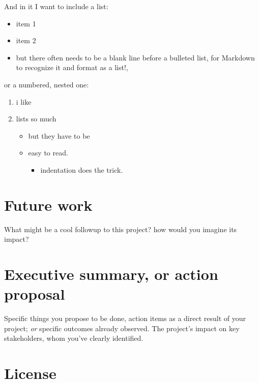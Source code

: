 \documentclass[
]{article}
\providecommand{\tightlist}{%
  \setlength{\itemsep}{0pt}\setlength{\parskip}{0pt}}
\begin{document}
And in it I want to include a list:

\begin{itemize}
\tightlist
\item
  item 1
\item
  item 2
\item
  but there often needs to be a blank line before a bulleted list, for
  Markdown to recognize it and format as a list!,
\end{itemize}

or a numbered, nested one:

\begin{enumerate}
\def\labelenumi{\arabic{enumi})}
\tightlist
\item
  i like
\item
  lists so much

  \begin{itemize}
  \tightlist
  \item
    but they have to be
  \item
    easy to read.

    \begin{itemize}
    \tightlist
    \item
      indentation does the trick.
    \end{itemize}
  \end{itemize}
\end{enumerate}

\hypertarget{future-work}{%
\section{Future work}\label{future-work}}

What might be a cool followup to this project? how would you imagine its
impact?

\hypertarget{executive-summary-or-action-proposal}{%
\section{Executive summary, or action
proposal}\label{executive-summary-or-action-proposal}}

Specific things you propose to be done, action items as a direct result
of your project; \emph{or} specific outcomes already observed. The
project's impact on key stakeholders, whom you've clearly identified.

\hypertarget{license}{%
\section{License}\label{license}}
\end{document}
